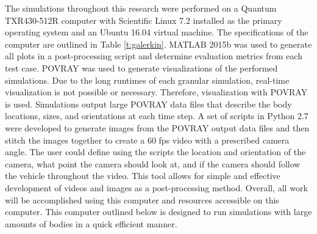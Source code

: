 \documentclass[12pt,onecolumn]{report}
\begin{document}
The simulations throughout this research were performed on a Quantum TXR430-512R computer with Scientific Linux 7.2 installed as the primary operating system and an Ubuntu 16.04 virtual machine. The specifications of the computer are outlined in Table \ref{t:galerkin}. MATLAB 2015b was used to generate all plots in a post-processing script and determine evaluation metrics from each test case. POVRAY was used to generate visualizations of the performed simulations. Due to the long runtimes of each granular simulation, real-time visualization is not possible or necessary. Therefore, visualization with POVRAY is used. Simulations output large POVRAY data files that describe the body locations, sizes, and orientations at each time step. A set of scripts in Python 2.7 were developed to generate images from the POVRAY output data files and then stitch the images together to create a 60 fps video with a prescribed camera angle. The user could define using the scripts the location and orientation of the camera, what point the camera should look at, and if the camera should follow the vehicle throughout the video. This tool allows for simple and effective development of videos and images as a post-processing method. Overall, all work will be accomplished using this computer and resources accessible on this computer. This computer outlined below is designed to run simulations with large amounts of bodies in a quick efficient manner.
\end{document}
